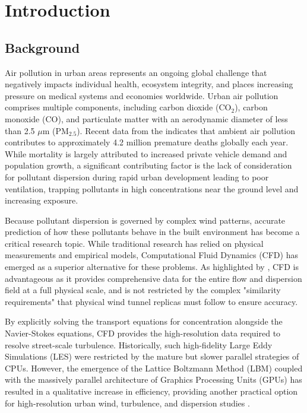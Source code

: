 \section{Introduction}
\subsection{Background}

Air pollution in urban areas represents an ongoing global challenge that negatively impacts individual health, ecosystem integrity, and places increasing pressure on medical systems and economies worldwide. Urban air pollution comprises multiple components, including carbon dioxide (CO$_2$), carbon monoxide (CO), and particulate matter with an aerodynamic diameter of less than 2.5 $\mu$m (PM$_{2.5}$). Recent data from the \textcite{WHO2024Ambient} indicates that ambient air pollution contributes to approximately 4.2 million premature deaths globally each year. While mortality is largely attributed to increased private vehicle demand and population growth, a significant contributing factor is the lack of consideration for pollutant dispersion during rapid urban development \parencite{Li2021Review} leading to poor ventilation, trapping pollutants in high concentrations near the ground level and increasing exposure.

Because pollutant dispersion is governed by complex wind patterns, accurate prediction of how these pollutants behave in the built environment has become a critical research topic. While traditional research has relied on physical measurements and empirical models, Computational Fluid Dynamics (CFD) has emerged as a superior alternative for these problems. As highlighted by \textcite{Shirzadi2024}, CFD is advantageous as it provides comprehensive data for the entire flow and dispersion field at a full physical scale, and is not restricted by the complex "similarity requirements" that physical wind tunnel replicas must follow to ensure accuracy. 

By explicitly solving the transport equations for concentration alongside the Navier-Stokes equations, CFD provides the high-resolution data required to resolve street-scale turbulence. Historically, such high-fidelity Large Eddy Simulations (LES) were restricted by the mature but slower parallel strategies of CPUs. However, the emergence of the Lattice Boltzmann Method (LBM) coupled with the massively parallel architecture of Graphics Processing Units (GPUs) has resulted in a qualitative increase in efficiency, providing another practical option for high-resolution urban wind, turbulence, and dispersion studies \parencite{Hu2025}.

